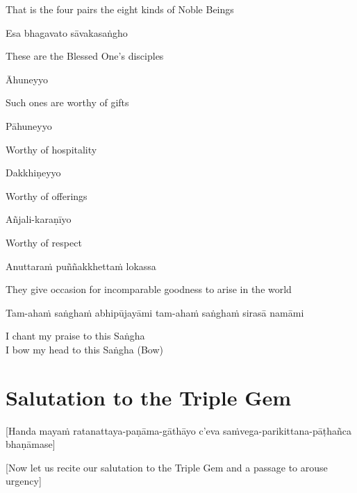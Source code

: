 \begin{english}
  That is the four pairs the eight kinds of Noble Beings
\end{english}

Esa bhagavato sāvakasaṅgho

\begin{english}
  These are the Blessed One’s disciples
\end{english}

Āhuneyyo

\begin{english}
  Such ones are worthy of gifts
\end{english}

Pāhuneyyo

\begin{english}
  Worthy of hospitality
\end{english}

Dakkhiṇeyyo

\begin{english}
  Worthy of offerings
\end{english}

Añjali-karaṇīyo

\begin{english}
  Worthy of respect
\end{english}

Anuttaraṁ puññakkhettaṁ lokassa

\begin{english}
  They give occasion for incomparable goodness to arise in the world
\end{english}

Tam-ahaṁ saṅghaṁ abhipūjayāmi tam-ahaṁ saṅghaṁ sirasā namāmi

\begin{english}
  I chant my praise to this Saṅgha\\
  I bow my head to this Saṅgha \hfill{(Bow)}
\end{english}

\section{Salutation to the Triple Gem}
\label{salutation}

\begin{center}
  [Handa mayaṁ ratanattaya-paṇāma-gāthāyo c'eva saṁvega-parikittana-pāṭhañca bhaṇāmase]
\end{center}
\begin{center}
  [Now let us recite our salutation to the Triple Gem and a passage to arouse urgency]
\end{center}


